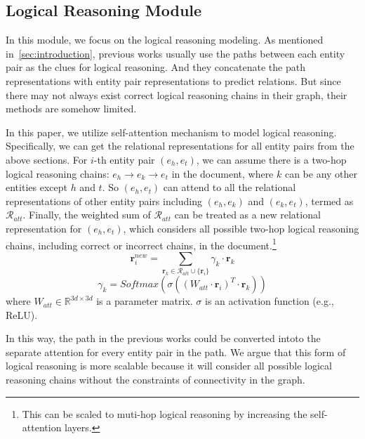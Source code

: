 \documentclass[11pt,a4paper]{article}
\begin{document}
\subsection{Logical Reasoning Module\label{ssec:reasoning}}
In this module, we focus on the logical reasoning modeling. As mentioned in~\ref{sec:introduction}, previous works usually use the paths between each entity pair as the clues for logical reasoning. And they concatenate the path representations with entity pair representations to predict relations. But since there may not always exist correct logical reasoning chains in their graph, their methods are somehow limited.

In this paper, we utilize self-attention mechanism \citep{transformer} to model logical reasoning. Specifically, we can get the relational representations for all entity pairs from the above sections. For $i$-th entity pair $(e_{h}, e_{t})$, we can assume there is a two-hop logical reasoning chains: $e_{h} \rightarrow e_{k} \rightarrow e_{t}$ in the document, where $k$ can be any other entities except $h$ and $t$. So $(e_{h}, e_{t})$ can attend to all the relational representations of other entity pairs including $(e_{h}, e_{k})$ and $(e_{k}, e_{t})$, termed as $\mathcal{R}_{att}$. Finally, the weighted sum of $\mathcal{R}_{att}$ can be treated as a new relational representation for $(e_{h}, e_{t})$, which considers all possible two-hop logical reasoning chains, including correct or incorrect chains, in the document.\footnote{This can be scaled to muti-hop logical reasoning by increasing the self-attention layers.}
\begin{equation}
    \textbf{r}^{new}_{i} = \sum_{\textbf{r}_k \in \mathcal{R}_{att} \cup \{\textbf{r}_i\}} \gamma_{k} \cdot \textbf{r}_{k}
\end{equation}
\begin{equation}
    \gamma_{k} = Softmax(\sigma((W_{att} \cdot \textbf{r}_{i})^T \cdot \textbf{r}_k))
\end{equation}
where  $W_{att} \in \mathbb{R}^{3d \times 3d}$ is a parameter matrix. $\sigma$ is an activation function (e.g., ReLU).

In this way, the path in the previous works could be converted intoto the separate attention for every entity pair in the path. We argue that this form of logical reasoning is more scalable because it will consider all possible logical reasoning chains without the constraints of connectivity in the graph. 
\end{document}
